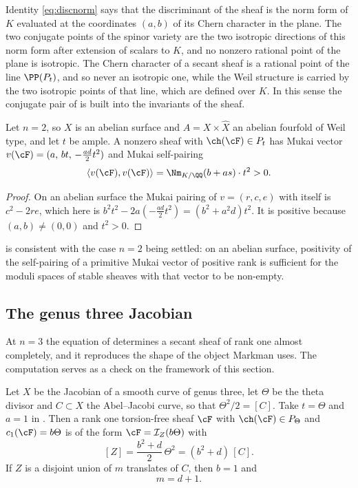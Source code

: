 \begin{remark}\label{rem:normdisc}
Identity \eqref{eq:discnorm} says that the discriminant of the sheaf is the
norm form of $K$ evaluated at the coordinates $(a,b)$ of its Chern character
in the plane. The two conjugate points of the spinor variety are the two
isotropic directions of this norm form after extension of scalars to $K$, and
no nonzero rational point of the plane is isotropic. The Chern character of a
secant sheaf is a rational point of the line $\PP(P_{t})$, and so never an
isotropic one, while the Weil structure is carried by the two isotropic points
of that line, which are defined over $K$. In this sense the conjugate pair of
 is built into the invariants of the sheaf.
\end{remark}

\begin{corollary}\label{cor:surfacecase}
Let $n=2$, so $X$ is an abelian surface and $A=X\times\widehat{X}$ an abelian
fourfold of Weil type, and let $t$ be ample. A nonzero sheaf with
$\ch(\cF)\in P_{t}$ has Mukai vector
$v(\cF)=(a,\,bt,\,-\tfrac{ad}{2}t^{2})$ and Mukai self-pairing
\[
  \langle v(\cF),v(\cF)\rangle=\Nm_{K/\QQ}(b+as)\cdot t^{2}>0 .
\]
\end{corollary}

\begin{proof}
On an abelian surface the Mukai pairing of $v=(r,c,e)$ with itself is
$c^{2}-2re$, which here is $b^{2}t^{2}-2a(-\tfrac{ad}{2}t^{2})=(b^{2}+a^{2}d)t^{2}$.
It is positive because $(a,b)\ne(0,0)$ and $t^{2}>0$.
\end{proof}

 is consistent with the case $n=2$ being settled: on an
abelian surface, positivity of the self-pairing of a primitive Mukai vector of
positive rank is sufficient for the moduli spaces of stable sheaves with that
vector to be non-empty.

\subsection{The genus three Jacobian}

At $n=3$ the equation of  determines a secant sheaf
of rank one almost completely, and it reproduces the shape of the object
Markman uses. The computation serves as a check on the framework of this
section.

\begin{proposition}[Rank one at $n=3$]\label{prop:genus3}
Let $X$ be the Jacobian of a smooth curve of genus three, let $\Theta$ be the
theta divisor and $C\subset X$ the Abel--Jacobi curve, so that
$\Theta^{2}/2=[C]$. Take $t=\Theta$ and $a=1$ in
. Then a rank one torsion-free sheaf $\cF$ with
$\ch(\cF)\in P_{\Theta}$ and $c_{1}(\cF)=b\Theta$ is of the form
$\cF=\mathcal{I}_{Z}(b\Theta)$ with
\[
  [Z]=\frac{b^{2}+d}{2}\,\Theta^{2}=(b^{2}+d)\,[C].
\]
If $Z$ is a disjoint union of $m$ translates of $C$, then $b=1$ and
\[
  m=d+1 .
\]
\end{proposition}

